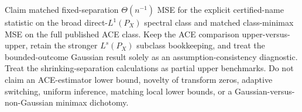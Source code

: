 Claim matched fixed-separation \(\Theta(n^{-1})\) MSE for the explicit certified-name statistic on the broad direct-\(L^1(P_X)\) spectral class and matched class-minimax MSE on the full published ACE class.  Keep the ACE comparison upper-versus-upper, retain the stronger \(L^s(P_X)\) subclass bookkeeping, and treat the bounded-outcome Gaussian result solely as an assumption-consistency diagnostic.  Treat the shrinking-separation calculations as partial upper benchmarks.  Do not claim an ACE-estimator lower bound, novelty of transform zeros, adaptive switching, uniform inference, matching local lower bounds, or a Gaussian-versus-non-Gaussian minimax dichotomy.